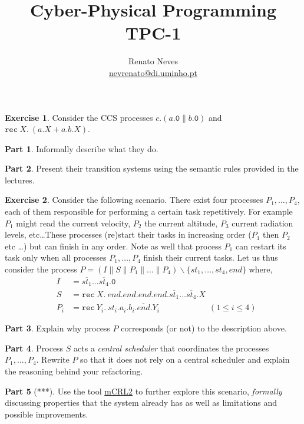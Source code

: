 \documentclass[a4paper, 11pt]{article}
\date{}
\theoremstyle{definition}
\newtheorem{exercise}{Exercise}
\theoremstyle{sub}
\newtheorem{subexercise}{Part}[exercise]
\begin{document}
\title{Cyber-Physical Programming \\ \large TPC-1}
\author{Renato Neves \\ \scriptsize
  \href{mailto:nevrenato@di.uminho.pt}{nevrenato@di.uminho.pt}}
\maketitle

\begin{exercise}
  Consider the CCS processes $c . (a. \mathtt{0} \parallel b. \mathtt{0})$ and
  $\mathtt{rec}\ X.\ (a.X + a.b.X)$. 
  \begin{subexercise}
    Informally describe what they do.
  \end{subexercise}
  \begin{subexercise}
    Present their transition systems using the semantic rules provided in the
    lectures.
  \end{subexercise} 
\end{exercise}

\begin{exercise}
  Consider the following scenario. There exist  four processes $P_1,\dots,P_4$,
  each of them responsible for performing a certain task repetitively. For
  example $P_1$ might read the current velocity, $P_2$ the current altitude,
  $P_3$ current radiation levels, etc\dots These processes (re)start their
  tasks in increasing order ($P_1$ then $P_2$ etc \dots) but can finish in any
  order. Note as well that process $P_1$ can restart its task only when all
  processes $P_1,\dots,P_4$ finish their current tasks.  Let us thus consider
  the process $P = (I \parallel S \parallel P_1 \parallel \dots \parallel P_4)
  \backslash \{st_1,\dots,st_4,end\}$ where,
  \begin{eqnarray*}
    & I  & = \overline{st_1} \dots \overline{st_4} . \mathtt{0} \\
    & S & = \mathtt{rec}\ X.\ end.end.end.end. \overline{st_1} \dots \overline{st_4}. X \\
    & P_i & = \mathtt{rec}\ Y_i .\ st_i . a_i . b_i . \overline{end} . Y_i \qquad \qquad \qquad
            (1 \leq i \leq 4)
  \end{eqnarray*}
  \begin{subexercise}
    Explain why process $P$ corresponds (or not) to the description above.
  \end{subexercise}
  \begin{subexercise}
    Process $S$ acts a \emph{central scheduler} that coordinates the processes
    $P_1,\dots,P_4$. Rewrite $P$ so that it does not rely on a central
    scheduler and explain the reasoning behind your refactoring.
  \end{subexercise}
  \begin{subexercise}[***]
    Use the tool \href{https://www.mcrl2.org/web/user_manual/index.html}{mCRL2}
    to further explore this scenario, \emph{formally} discussing properties
    that the system already has as well as limitations and possible
    improvements.
  \end{subexercise}
\end{exercise}
\end{document}
